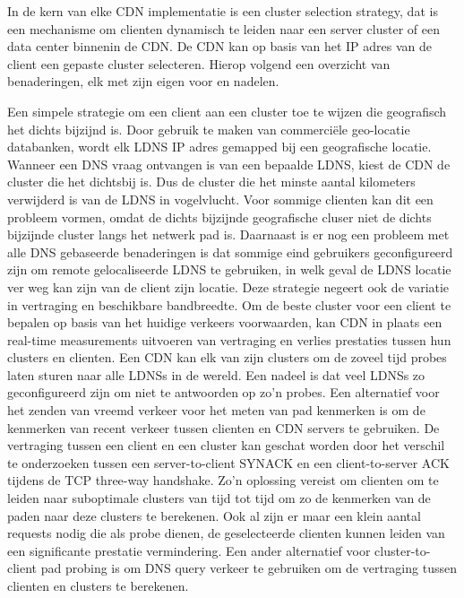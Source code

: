 \clearpage


In de kern van elke CDN implementatie is een cluster selection strategy, dat is een mechanisme om clienten dynamisch te leiden naar een server cluster of een data center binnenin de CDN. De CDN kan op basis van het IP adres van de client een gepaste cluster selecteren.
Hierop volgend een overzicht van benaderingen, elk met zijn eigen voor en nadelen.

Een simpele strategie om een client aan een cluster toe te wijzen die geografisch het dichts bijzijnd is. Door gebruik te maken van commerciële geo-locatie databanken, wordt elk LDNS IP adres gemapped bij een geografische locatie. Wanneer een DNS vraag ontvangen is van een bepaalde LDNS, kiest de CDN de cluster die het dichtsbij is. Dus de cluster die het minste aantal kilometers verwijderd is van de LDNS in vogelvlucht.
Voor sommige clienten kan dit een probleem vormen, omdat de dichts bijzijnde geografische cluser niet de dichts bijzijnde cluster langs het netwerk pad is. Daarnaast is er nog een probleem met alle DNS gebaseerde benaderingen is dat sommige eind gebruikers geconfigureerd zijn om remote gelocaliseerde LDNS te gebruiken, in welk geval de LDNS locatie ver weg kan zijn van de client zijn locatie. Deze strategie negeert ook de variatie in vertraging en beschikbare bandbreedte.
Om de beste cluster voor een client te bepalen op basis van het huidige verkeers voorwaarden, kan CDN in plaats een real-time measurements uitvoeren van vertraging en verlies prestaties tussen hun clusters en clienten. Een CDN kan elk van zijn clusters om de zoveel tijd probes laten sturen naar alle LDNSs in de wereld. Een nadeel is dat veel LDNSs zo geconfigureerd zijn om niet te antwoorden op zo’n probes.
Een alternatief voor het zenden van vreemd verkeer voor het meten van pad kenmerken is om de kenmerken van recent verkeer tussen clienten en CDN servers te gebruiken. De vertraging tussen een client en een cluster kan geschat worden door het verschil te onderzoeken tussen een server-to-client SYNACK en een client-to-server ACK tijdens de TCP three-way handshake. Zo’n oplossing vereist om clienten om te leiden naar suboptimale clusters van tijd tot tijd om zo de kenmerken van de paden naar deze clusters te berekenen. Ook al zijn er maar een klein aantal requests nodig die als probe dienen, de geselecteerde clienten kunnen leiden van een significante prestatie vermindering.
Een ander alternatief voor cluster-to-client pad probing is om DNS query verkeer te gebruiken om de vertraging tussen clienten en clusters te berekenen.

